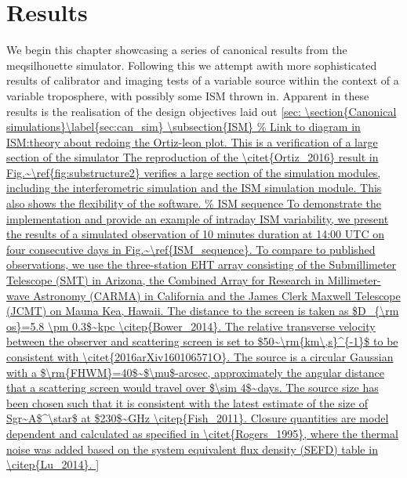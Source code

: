 \chapter{Results}
We begin this chapter showcasing a series of canonical results from the {\sc meqsilhouette} simulator. 
Following this we attempt awith more sophisticated results of calibrator and imaging tests of a variable source within the context of a variable troposphere, with possibly some ISM thrown in.
Apparent in these results is the realisation of the design objectives laid out \ref{sec:

\section{Canonical simulations}\label{sec:can_sim}




\subsection{ISM}


The reproduction of the \citet{Ortiz_2016} result in Fig.~\ref{fig:substructure2} verifies a large section of the simulation modules, including the interferometric simulation and the ISM simulation module. This also shows the flexibility of the software.




To demonstrate the implementation and provide an example of intraday ISM variability, we present the results of a simulated observation of 10 minutes duration at 14:00 UTC on four consecutive days in Fig.~\ref{ISM_sequence}. To compare to published observations, we use the three-station EHT array consisting of the Submillimeter Telescope (SMT) in Arizona, the Combined Array for Research in Millimeter-wave Astronomy (CARMA) in California and the James Clerk Maxwell Telescope (JCMT) on Mauna Kea, Hawaii. The distance to the screen is taken as $D_{\rm os}=5.8 \pm 0.3$~kpc  \citep{Bower_2014}. The relative transverse velocity between the observer and scattering screen is set to $50~\rm{km\,s}^{-1}$ to be consistent with \citet{2016arXiv160106571O}. The source is a circular Gaussian with a $\rm{FHWM}=40$~$\mu$-arcsec, approximately the angular distance that a scattering screen would travel over $\sim 4$~days. The source size has been chosen such that it is consistent with the latest estimate of the size of Sgr~A$^\star$ at $230$~GHz \citep{Fish_2011}.  Closure quantities are model dependent and calculated as specified in \citet{Rogers_1995}, where the thermal noise was added based on the system equivalent flux density (SEFD) table in \citep{Lu_2014}. 


}
